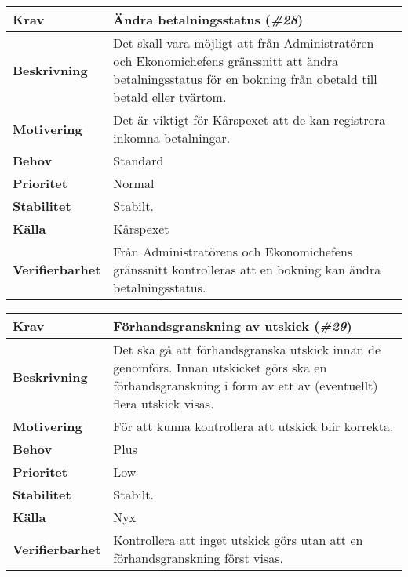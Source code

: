 \documentclass[a4paper, twoside, 11pt, titlepage]{article}
\begin{document}
	\begin{tabular} { p{2.6cm} p{12.5cm} }
		\hline
		\sffamily\textbf{Krav} & Ändra betalningsstatus (\emph{\#28})  \\
		\hline
		\sffamily\textbf{Beskrivning} & Det skall vara möjligt att från Administratören och Ekonomichefens gränssnitt att ändra betalningsstatus för en bokning från obetald till betald eller tvärtom.  \\
		\hline
		\sffamily\textbf{Motivering} & Det är viktigt för Kårspexet att de kan registrera inkomna betalningar.  \\
		\hline
		\sffamily\textbf{Behov} & Standard  \\
		\hline
		\sffamily\textbf{Prioritet} & Normal  \\
		\hline
		\sffamily\textbf{Stabilitet} & Stabilt.  \\
		\hline
		\sffamily\textbf{Källa} & Kårspexet  \\
		\hline
		\sffamily\textbf{Verifierbarhet} & Från Administratörens och Ekonomichefens gränssnitt kontrolleras att en bokning kan ändra betalningsstatus.  \\
		\hline
	\end{tabular}
	\vspace{6mm}

	\begin{tabular} { p{2.6cm} p{12.5cm} }
		\hline
		\sffamily\textbf{Krav} & Förhandsgranskning av utskick (\emph{\#29})  \\
		\hline
		\sffamily\textbf{Beskrivning} & Det ska gå att förhandsgranska utskick innan de genomförs. Innan utskicket görs ska en förhandsgranskning i form av ett av (eventuellt) flera utskick visas.  \\
		\hline
		\sffamily\textbf{Motivering} & För att kunna kontrollera att utskick blir korrekta.  \\
		\hline
		\sffamily\textbf{Behov} & Plus  \\
		\hline
		\sffamily\textbf{Prioritet} & Low  \\
		\hline
		\sffamily\textbf{Stabilitet} & Stabilt.  \\
		\hline
		\sffamily\textbf{Källa} & Nyx  \\
		\hline
		\sffamily\textbf{Verifierbarhet} & Kontrollera att inget utskick görs utan att en förhandsgranskning först visas.  \\
		\hline
	\end{tabular}
	\vspace{6mm}
\end{document}
